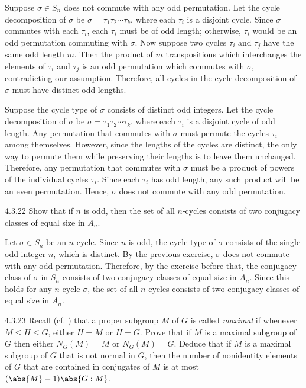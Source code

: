 \begin{soliff}
	\rightimp Suppose $\sigma \in S_n$ does not commute with any odd permutation.
	Let the cycle decomposition of $\sigma$ be $\sigma = \tau_1\tau_2\cdots\tau_k$, where each $\tau_i$ is a disjoint cycle.
	Since $\sigma$ commutes with each $\tau_i$, each $\tau_i$ must be of odd length; otherwise, $\tau_i$ would be an odd permutation commuting with $\sigma$.
	Now suppose two cycles $\tau_i$ and $\tau_j$ have the same odd length $m$.
	Then the product of $m$ transpositions which interchanges the elements of $\tau_i$ and $\tau_j$ is an odd permutation which commutes with $\sigma$, contradicting our assumption.
	Therefore, all cycles in the cycle decomposition of $\sigma$ must have distinct odd lengths.

	\leftimp Suppose the cycle type of $\sigma$ consists of distinct odd integers.
	Let the cycle decomposition of $\sigma$ be $\sigma = \tau_1\tau_2\cdots\tau_k$, where each $\tau_i$ is a disjoint cycle of odd length.
	Any permutation that commutes with $\sigma$ must permute the cycles $\tau_i$ among themselves.
	However, since the lengths of the cycles are distinct, the only way to permute them while preserving their lengths is to leave them unchanged.
	Therefore, any permutation that commutes with $\sigma$ must be a product of powers of the individual cycles $\tau_i$.
	Since each $\tau_i$ has odd length, any such product will be an even permutation.
	Hence, $\sigma$ does not commute with any odd permutation.
\end{soliff}

\begin{exercise}{4.3.22}
	Show that if $n$ is odd, then the set of all $n$-cycles consists of two conjugacy classes of equal size in $A_n$.
\end{exercise}

\begin{sol}
	Let $\sigma \in S_n$ be an $n$-cycle.
	Since $n$ is odd, the cycle type of $\sigma$ consists of the single odd integer $n$, which is distinct.
	By the previous exercise, $\sigma$ does not commute with any odd permutation.
	Therefore, by the exercise before that, the conjugacy class of $\sigma$ in $S_n$ consists of two conjugacy classes of equal size in $A_n$.
	Since this holds for any $n$-cycle $\sigma$, the set of all $n$-cycles consists of two conjugacy classes of equal size in $A_n$.
\end{sol}

\begin{exercise}{4.3.23}
	Recall (cf. ) that a proper subgroup $M$ of $G$ is called \emph{maximal} if whenever $M \leq H \leq G$, either $H = M$ or $H = G$.
	Prove that if $M$ is a maximal subgroup of $G$ then either $N_G(M) = M$ or $N_G(M) = G$.
	Deduce that if $M$ is a maximal subgroup of $G$ that is not normal in $G$, then the number of nonidentity elements of $G$ that are contained in conjugates of $M$ is at most $(\abs{M} - 1)\abs{G : M}$.
\end{exercise}

